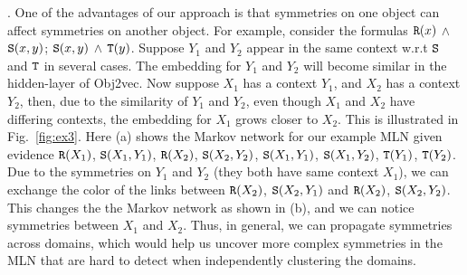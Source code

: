 . One of the advantages of our approach is that symmetries on one object can affect symmetries on another object. For example, consider the formulas ${\tt R}(x)$ $\wedge$ ${\tt S}(x,y)$; ${\tt S}(x,y)$ $\wedge$ ${\tt T}(y)$. Suppose $Y_1$ and $Y_2$ appear in the same context w.r.t  ${\tt S}$ and ${\tt T}$ in several cases. The embedding for $Y_1$ and $Y_2$ will become similar in the hidden-layer of Obj2vec. Now suppose $X_1$ has a context $Y_1$, and $X_2$ has a context $Y_2$, then, due to the similarity of $Y_1$ and $Y_2$, even though $X_1$ and $X_2$ have differing contexts, the embedding for $X_1$ grows closer to $X_2$. This is illustrated in Fig.~\ref{fig:ex3}. Here (a) shows the Markov network for our example MLN given evidence ${\tt R}(X_1)$, ${\tt S}(X_1,Y_1)$, ${\tt R}(X_2)$, ${\tt S}(X_2,Y_2)$, ${\tt S}(X_1,Y_1)$, ${\tt S}(X_1,Y_2)$, ${\tt T}(Y_1)$, ${\tt T}(Y_2)$. Due to the symmetries on $Y_1$ and $Y_2$ (they both have same context $X_1$), we can exchange the color of the links between ${\tt R}(X_2)$, ${\tt S}(X_2,Y_1)$ and ${\tt R}(X_2)$, ${\tt S}(X_2,Y_2)$. This changes the the Markov network as shown in (b), and we can notice symmetries between $X_1$ and $X_2$. Thus, in general, we can propagate symmetries across domains, which would help us uncover more complex symmetries in the MLN that are hard to detect when independently clustering the domains.










